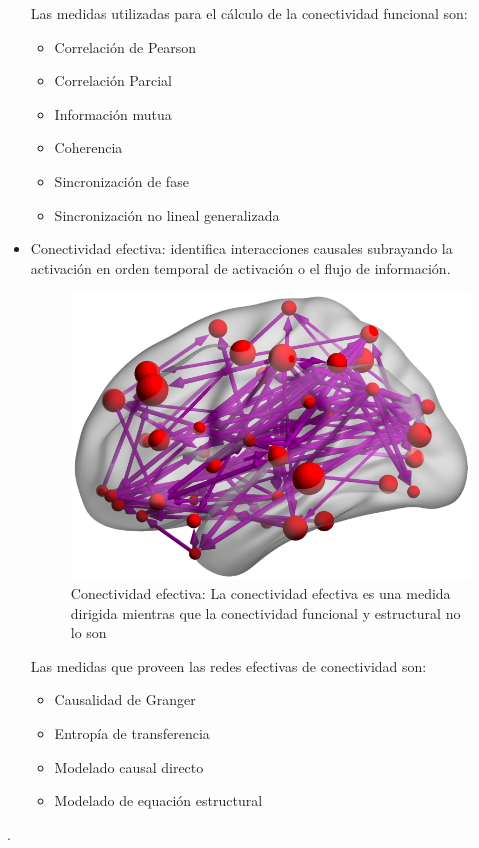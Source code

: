 \begin{itemize}
	Las medidas utilizadas para el cálculo de la conectividad funcional son:
	\begin{itemize}
		\item Correlación de Pearson
		\item Correlación Parcial
		\item Información mutua
		\item Coherencia
		\item Sincronización de fase
		\item Sincronización no lineal generalizada
	\end{itemize}
	
	\item Conectividad efectiva: identifica interacciones causales subrayando la activación en orden temporal de activación o el flujo de información.
	
	\begin{figure}[H]
  		\centering
    	\includegraphics[scale=0.5]{img/eff_conect.png}
  		\caption{Conectividad efectiva: La conectividad efectiva es una medida dirigida mientras que la conectividad funcional y estructural no lo son}         \label{preproc:eff_conect}
	\end{figure}	
	
	Las medidas que proveen las redes efectivas de conectividad son:
	\begin{itemize}
		\item Causalidad de Granger
		\item Entropía de transferencia
		\item Modelado causal directo
		\item Modelado de equación estructural
	\end{itemize}
\end{itemize}
\cite{brainhack}.


